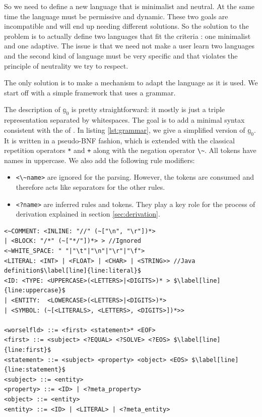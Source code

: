 \documentclass[11pt,a4paper,twoside,openright,titlepage,numbers=noenddot,headinclude,cleardoublepage=empty,openany]{scrreprt}
\theoremstyle{plain}
\theoremstyle{definition}
\theoremstyle{remark}
\newcommand{\passthrough}[1]{#1}
\providecommand{\tightlist}{%
  \setlength{\itemsep}{0pt}\setlength{\parskip}{0pt}}
\newcommand{\bb}{\mathbb}
\begin{document}
So we need to define a new language that is minimalist and neutral. At
the same time the language must be permissive and dynamic. These two
goals are incompatible and will end up needing different solutions. So
the solution to the problem is to actually define two languages that fit
the criteria : one minimalist and one adaptive. The issue is that we
need not make a user learn two languages and the second kind of language
must be very specific and that violates the principle of neutrality we
try to respect.

The only solution is to make a mechanism to adapt the language as it is
used. We start off with a simple framework that uses a grammar.

The description of \(\bb{g}_0\) is pretty straightforward: it mostly is
just a triple representation separated by whitespaces. The goal is to
add a minimal syntax consistent with the
 of . In
listing \ref{lst:grammar}, we give a simplified version of \(\bb{g}_0\).
It is written in a pseudo-BNF fashion, which is extended with the
classical repetition operators \passthrough{\lstinline!*!} and
\passthrough{\lstinline!+!} along with the negation operator
\passthrough{\lstinline!\~!}. All tokens have names in uppercase. We
also add the following rule modifiers:

\begin{itemize}
\tightlist
\item
  \passthrough{\lstinline!<\~name>!} are ignored for the parsing.
  However, the tokens are consumed and therefore acts like separators
  for the other rules.
\item
  \passthrough{\lstinline!<?name>!} are inferred rules and tokens. They
  play a key role for the process of derivation explained in
  section \ref{sec:derivation}.
\end{itemize}

\begin{lstlisting}[caption={Simplified pseudo-BNF description for basic SELF.}, escapechar={$}, label=lst:grammar]
<~COMMENT: <INLINE: "//" (~["\n", "\r"])*>
| <BLOCK: "/*" (~["*/"])*> > //Ignored
<~WHITE_SPACE: " "|"\t"|"\n"|"\r"|"\f">
<LITERAL: <INT> | <FLOAT> | <CHAR> | <STRING>> //Java definition$\label[line]{line:literal}$
<ID: <TYPE: <UPPERCASE>(<LETTERS>|<DIGITS>)* > $\label[line]{line:uppercase}$
| <ENTITY:  <LOWERCASE>(<LETTERS>|<DIGITS>)*> 
| <SYMBOL: (~[<LITERALS>, <LETTERS>, <DIGITS>])*>>

<worselfld> ::= <first> <statement>* <EOF>
<first> ::= <subject> <?EQUAL> <?SOLVE> <?EOS> $\label[line]{line:first}$
<statement> ::= <subject> <property> <object> <EOS> $\label[line]{line:statement}$
<subject> ::= <entity>
<property> ::= <ID> | <?meta_property>
<object> ::= <entity>
<entity> ::= <ID> | <LITERAL> | <?meta_entity>
\end{lstlisting}
\end{document}
